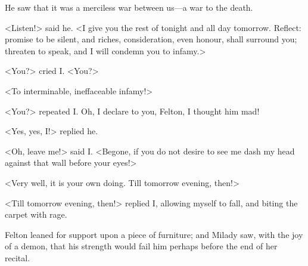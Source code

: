 {He saw that it was a merciless war between us—a war to the death. 

<Listen!> said he. <I give you the rest of tonight and all day tomorrow. Reflect: promise to be silent, and riches, consideration, even honour, shall surround you; threaten to speak, and I will condemn you to infamy.> 

<You?> cried I. <You?> 

<To interminable, ineffaceable infamy!>

<You?> repeated I. Oh, I declare to you, Felton, I thought him mad! 

<Yes, yes, I!> replied he. 

<Oh, leave me!> said I. <Begone, if you do not desire to see me dash my head against that wall before your eyes!> 

<Very well, it is your own doing. Till tomorrow evening, then!>

<Till tomorrow evening, then!> replied I, allowing myself to fall, and biting the carpet with rage.} 

Felton leaned for support upon a piece of furniture; and Milady saw, with the joy of a demon, that his strength would fail him perhaps before the end of her recital. 
